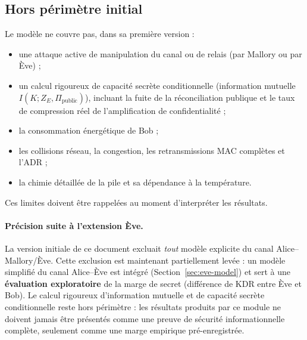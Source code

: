 \documentclass[conference,a4paper]{IEEEtran}
\begin{document}
\subsection{Hors périmètre initial}
Le modèle ne couvre pas, dans sa première version :
\begin{itemize}
    \item une attaque active de manipulation du canal ou de relais (par Mallory ou par Ève) ;
    \item un calcul rigoureux de capacité secrète conditionnelle (information mutuelle $I(K;Z_E,\Pi_{\mathrm{public}})$), incluant la fuite de la réconciliation publique et le taux de compression réel de l'amplification de confidentialité ;
    \item la consommation énergétique de Bob ;
    \item les collisions réseau, la congestion, les retransmissions MAC complètes et l'ADR ;
    \item la chimie détaillée de la pile et sa dépendance à la température.
\end{itemize}
Ces limites doivent être rappelées au moment d'interpréter les résultats.

\paragraph{Précision suite à l'extension Ève.} La version initiale de ce document excluait \emph{tout} modèle explicite du canal Alice--Mallory/Ève. Cette exclusion est maintenant partiellement levée : un modèle simplifié du canal Alice--Ève est intégré (Section~\ref{sec:eve-model}) et sert à une \textbf{évaluation exploratoire} de la marge de secret (différence de KDR entre Ève et Bob). Le calcul rigoureux d'information mutuelle et de capacité secrète conditionnelle reste hors périmètre : les résultats produits par ce module ne doivent jamais être présentés comme une preuve de sécurité informationnelle complète, seulement comme une marge empirique pré-enregistrée.
\end{document}
